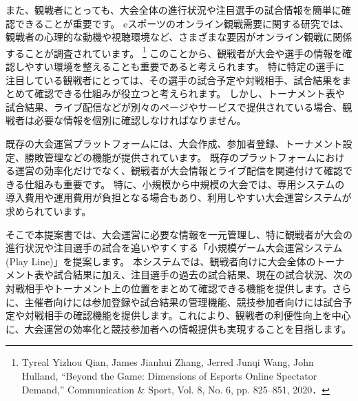 また、観戦者にとっても、大会全体の進行状況や注目選手の試合情報を簡単に確認できることが重要です。
eスポーツのオンライン観戦需要に関する研究では、観戦者の心理的な動機や視聴環境など、さまざまな要因がオンライン観戦に関係することが調査されています。
\footnote[3]{Tyreal Yizhou Qian, James Jianhui Zhang, Jerred Junqi Wang, John Hulland, “Beyond the Game: Dimensions of Esports Online Spectator Demand,” Communication \& Sport, Vol. 8, No. 6, pp. 825–851, 2020．}
このことから、観戦者が大会や選手の情報を確認しやすい環境を整えることも重要であると考えられます。
特に特定の選手に注目している観戦者にとっては、その選手の試合予定や対戦相手、試合結果をまとめて確認できる仕組みが役立つと考えられます。
しかし、トーナメント表や試合結果、ライブ配信などが別々のページやサービスで提供されている場合、観戦者は必要な情報を個別に確認しなければなりません。

既存の大会運営プラットフォームには、大会作成、参加者登録、トーナメント設定、勝敗管理などの機能が提供されています。
既存のプラットフォームにおける運営の効率化だけでなく、観戦者が大会情報とライブ配信を関連付けて確認できる仕組みも重要です。
特に、小規模から中規模の大会では、専用システムの導入費用や運用費用が負担となる場合もあり、利用しやすい大会運営システムが求められています。

そこで本提案書では、大会運営に必要な情報を一元管理し、特に観戦者が大会の進行状況や注目選手の試合を追いやすくする「小規模ゲーム大会運営システム(Play Line)」を提案します。
本システムでは、観戦者向けに大会全体のトーナメント表や試合結果に加え、注目選手の過去の試合結果、現在の試合状況、次の対戦相手やトーナメント上の位置をまとめて確認できる機能を提供します。さらに、主催者向けには参加登録や試合結果の管理機能、競技参加者向けには試合予定や対戦相手の確認機能を提供します。これにより、観戦者の利便性向上を中心に、大会運営の効率化と競技参加者への情報提供も実現することを目指します。